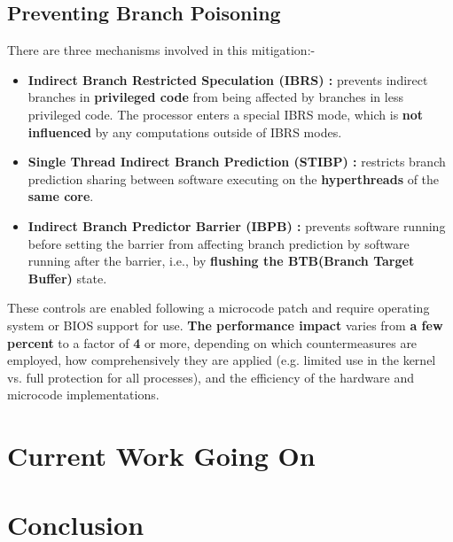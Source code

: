 \documentclass[12pt]{article}
\begin{document}
\subsection{Preventing Branch Poisoning}
There are three mechanisms involved in this mitigation:- 
\begin{itemize}
	\item \textbf{Indirect Branch Restricted Speculation (IBRS) : } prevents indirect branches in \textbf{privileged code} from being affected by branches in less privileged code. The processor enters a special IBRS mode, which is \textbf{not influenced} by any computations outside of IBRS modes.
	\item \textbf{Single Thread Indirect Branch Prediction (STIBP) : } restricts branch prediction sharing between software executing on the \textbf{hyperthreads} of the \textbf{same core}.
	\item \textbf{Indirect Branch Predictor Barrier (IBPB) : } prevents software running before setting the barrier from affecting branch prediction by software running after the barrier, i.e., by \textbf{flushing the BTB(Branch Target Buffer)} state.
\end{itemize}
These controls are enabled following a microcode patch and require operating system or BIOS support for use. \textbf{The performance impact} varies from \textbf{a few percent} to a factor of \textbf{4} or more, depending on which countermeasures are employed, how comprehensively they are applied (e.g. limited use in the kernel vs. full protection for all processes), and the efficiency of the hardware and microcode implementations.
\section{Current Work Going On}
\section{Conclusion}
\end{document}
